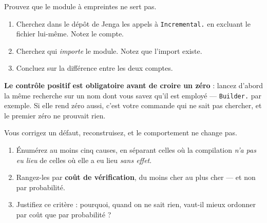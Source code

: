 \begin{nkdemo}
Prouvez que le module à empreintes ne sert pas.

\begin{enumerate}
\item Cherchez dans le dépôt de Jenga les appels à \texttt{Incremental.} en
      excluant le fichier lui-même. Notez le compte.
\item Cherchez qui \emph{importe} le module. Notez que l'import existe.
\item Concluez sur la différence entre les deux comptes.
\end{enumerate}

\alerte{} \textbf{Le contrôle positif est obligatoire avant de croire un zéro} :
lancez d'abord la même recherche sur un nom dont vous savez qu'il est employé ---
\texttt{Builder.} par exemple. Si elle rend zéro aussi, c'est votre commande qui
ne sait pas chercher, et le premier zéro ne prouvait rien.
\end{nkdemo}

\begin{nklogique}
Vous corrigez un défaut, reconstruisez, et le comportement ne change pas.

\begin{enumerate}
\item Énumérez au moins cinq causes, en séparant celles où la compilation
      \emph{n'a pas eu lieu} de celles où elle a eu lieu \emph{sans effet}.
\item Rangez-les par \textbf{coût de vérification}, du moins cher au plus cher
      --- et non par probabilité.
\item Justifiez ce critère : pourquoi, quand on ne sait rien, vaut-il mieux
      ordonner par coût que par probabilité ?
\end{enumerate}
\end{nklogique}
